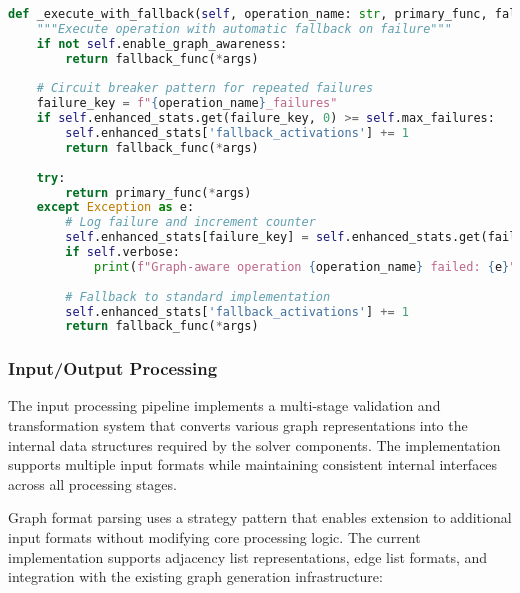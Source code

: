 \begin{lstlisting}[language=Python, caption=Robust Error Handling and Fallback Mechanisms]
def _execute_with_fallback(self, operation_name: str, primary_func, fallback_func, *args):
    """Execute operation with automatic fallback on failure"""
    if not self.enable_graph_awareness:
        return fallback_func(*args)
    
    # Circuit breaker pattern for repeated failures
    failure_key = f"{operation_name}_failures"
    if self.enhanced_stats.get(failure_key, 0) >= self.max_failures:
        self.enhanced_stats['fallback_activations'] += 1
        return fallback_func(*args)
    
    try:
        return primary_func(*args)
    except Exception as e:
        # Log failure and increment counter
        self.enhanced_stats[failure_key] = self.enhanced_stats.get(failure_key, 0) + 1
        if self.verbose:
            print(f"Graph-aware operation {operation_name} failed: {e}")
        
        # Fallback to standard implementation
        self.enhanced_stats['fallback_activations'] += 1
        return fallback_func(*args)
\end{lstlisting}

\subsubsection{Input/Output Processing}

The input processing pipeline implements a multi-stage validation and transformation system that converts various graph representations into the internal data structures required by the solver components. The implementation supports multiple input formats while maintaining consistent internal interfaces across all processing stages.

Graph format parsing uses a strategy pattern that enables extension to additional input formats without modifying core processing logic. The current implementation supports adjacency list representations, edge list formats, and integration with the existing graph generation infrastructure:

